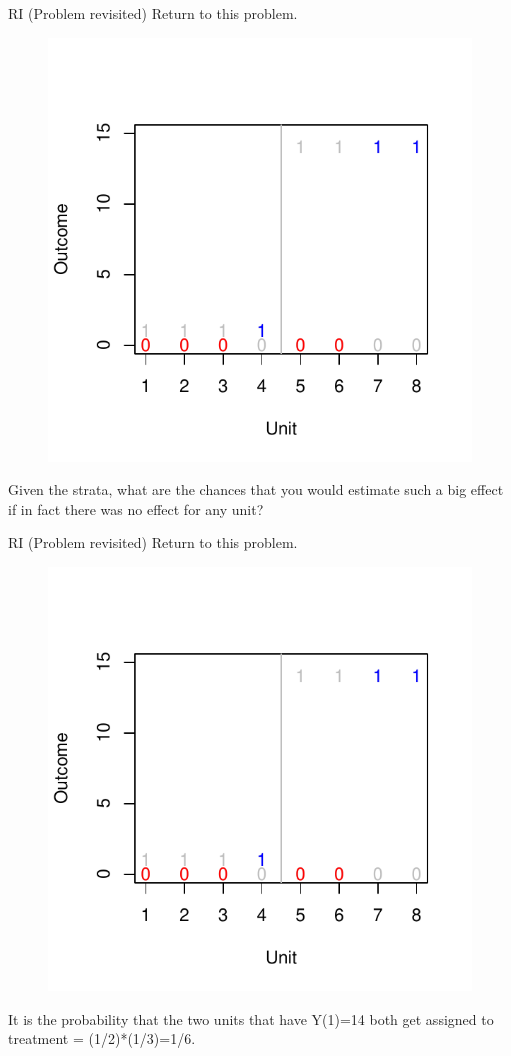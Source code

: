 \documentclass[
  11pt,
  ignorenonframetext,
]{beamer}
\begin{document}
\begin{frame}{RI (Problem revisited)}
\protect\hypertarget{ri-problem-revisited}{}
\small Return to this problem.

\begin{figure}[h]
\centering
\includegraphics[width=.4\linewidth]{figs/nools}
\end{figure}

Given the strata, what are the chances that you would estimate such a
big effect if in fact there was no effect for any unit?
\end{frame}

\begin{frame}{RI (Problem revisited)}
\protect\hypertarget{ri-problem-revisited-1}{}
\small  Return to this problem.

\begin{figure}[h]
\centering
\includegraphics[width=.4\linewidth]{figs/nools}
\end{figure}

It is the probability that the two units that have Y(1)=14 both get
assigned to treatment = (1/2)*(1/3)=1/6.
\end{frame}
\end{document}
